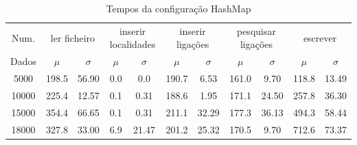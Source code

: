 \documentclass[a5paper,twocolumn, 11pt]{article}
\begin{document}
\clearpage
\onecolumn
    \begin{table}[h!b!t!]
    \begin{center}
    \caption{Tempos da configuração HashMap}
\begin{tabular}{ | *{11}{c|} }
\hline
    Num. & \multicolumn{2}{|c|}{ler ficheiro} & \multicolumn{2}{|c|}{inserir localidades} & \multicolumn{2}{|c|}{inserir ligações} & \multicolumn{2}{|c|}{pesquisar ligações} & \multicolumn{2}{|c|}{escrever}\\ %
    
    Dados & $\mu$ & $\sigma$ & $\mu$ & $\sigma$ & $\mu$ & $\sigma$ & $\mu$ & $\sigma$ & $\mu$ & $\sigma$\\ \hline
    5000 & 198.5 & 56.90 & 0.0 & 0.0 & 190.7 & 6.53 & 161.0 & 9.70 & 118.8 & 13.49\\ \hline
    10000 & 225.4 & 12.57 & 0.1 & 0.31 & 188.6 & 1.95 & 171.1 & 24.50 & 257.8 & 36.30\\ \hline
    15000 & 354.4 & 66.65 & 0.1 & 0.31 & 211.1 & 32.29 & 177.3 & 36.13 & 494.3 & 58.44\\ \hline
    18000 & 327.8 & 33.00 & 6.9 & 21.47 & 201.2 & 25.32 & 170.5 & 9.70 & 712.6 & 73.37\\ \hline
\end{tabular}
\end{center}
\end{table}
\end{document}
